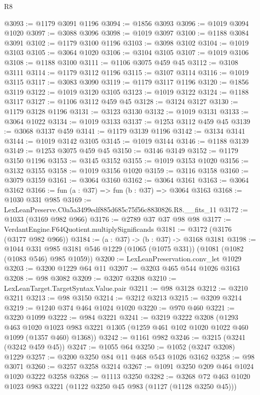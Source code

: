 \begin{lexlean}{R8}
\begin{coremodule}
@3093 := @1179 @3091 @1196
@3094 := @1856 @3093
@3096 := @1019 @3094 @1020
@3097 := @3088 @3096
@3098 := @1019 @3097
@3100 := @1188 @3084 @3091
@3102 := @1179 @3100 @1196
@3103 := @3098 @3102
@3104 := @1019 @3103
@3105 := @3064 @1020
@3106 := @3104 @3105
@3107 := @1019 @3106
@3108 := @1188 @3100
@3111 := @1106 @3075 @459 @45
@3112 := @3108 @3111
@3114 := @1179 @3112 @1196
@3115 := @3107 @3114
@3116 := @1019 @3115
@3117 := @3083 @3090
@3119 := @1179 @3117 @1196
@3120 := @1856 @3119
@3122 := @1019 @3120 @3105
@3123 := @1019 @3122
@3124 := @1188 @3117
@3127 := @1106 @3112 @459 @45
@3128 := @3124 @3127
@3130 := @1179 @3128 @1196
@3131 := @3123 @3130
@3132 := @1019 @3131
@3133 := @3064 @1022
@3134 := @1019 @3133
@3137 := @1253 @3112 @459 @45
@3139 := @3068 @3137 @459
@3141 := @1179 @3139 @1196
@3142 := @3134 @3141
@3144 := @1019 @3142 @3105
@3145 := @1019 @3144
@3146 := @1188 @3139
@3149 := @1253 @3075 @459 @45
@3150 := @3146 @3149
@3152 := @1179 @3150 @1196
@3153 := @3145 @3152
@3155 := @1019 @3153 @1020
@3156 := @3132 @3155
@3158 := @1019 @3156 @1020
@3159 := @3116 @3158
@3160 := @3079 @3159
@3161 := @3064 @3160
@3162 := @3064 @3161
@3163 := @3064 @3162
@3166 := fun (a : @37) => fun (b : @37) => @3064 @3163
@3168 := @1030 @331 @985
@3169 := LexLeanPreserve.C0a5a3499edf885d685c75f56c8830826.R8.__fits_11
@3172 := @1033 (@3169 @982 @966)
@3176 := @2789 @37 @37 @98 @98
@3177 := VerdantEngine.F64Quotient.multiplySignificands
@3181 := @3172 (@3176 (@3177 @982 @966))
@3184 := (a : @37) -> (b : @37) -> @3168 @3181
@3198 := @1044
    @331
    @985
    @3181
    @546
    @1229
    (@1065 (@1075 @331))
    (@1081 (@1082 (@1083 @546) @985 @1059))
@3200 := LexLeanPreservation.conv_let @1029
@3203 := @3200 @1229 @64 @11
@3207 := @3203 @465 @544 @1026 @3163
@3208 := @98 @3082
@3209 := @3207 @3208
@3210 := LexLeanTarget.TargetSyntax.Value.pair
@3211 := @98 @3128
@3212 := @3210 @3211
@3213 := @98 @3150
@3214 := @3212 @3213
@3215 := @3209 @3214
@3219 := @1240 @374 @464 @1024 @1020
@3220 := @970 @460
@3221 := @3220 @1099
@3222 := @984 @3221
@3241 := @3219
    @3222
    @3208
    (@1293
      @463
      @1020
      @1023
      @983
      @3221
      @1305
      (@1259 @461 @102 @1020 @1022 @460 @1099 (@1357 @460) @1368))
@3242 := @1161 @982
@3246 := @3215 (@3241 (@3242 @459 @45))
@3247 := @1055 @64
@3250 := @1052 (@3247 @3208) @1229
@3257 := @3200 @3250 @84 @11 @468 @543 @1026 @3162
@3258 := @98 @3071
@3260 := @3257 @3258 @3214
@3267 := @1091 @3250 @209 @464 @1024 @1020 @3222 @3258
@3268 := @1113 @3250
@3282 := @3268 @72 @463 @1020 @1023 @983 @3221 (@1122 @3250 @45 @983 (@1127 (@1128 @3250 @45)))

\end{coremodule}
\end{lexlean}
